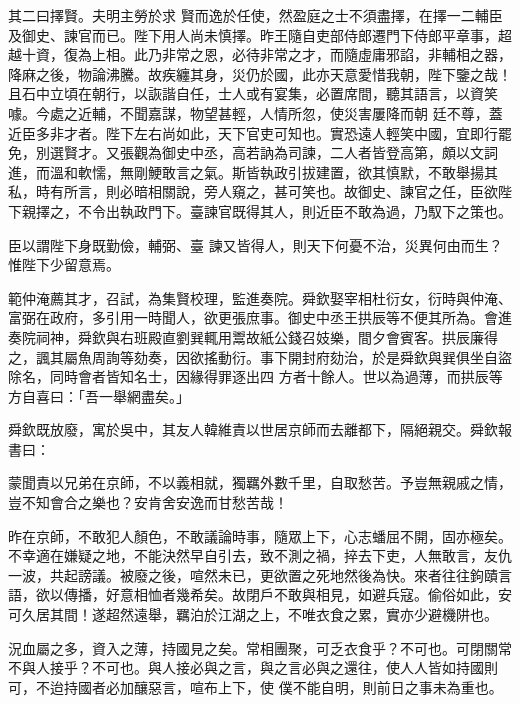 \begin{pinyinscope}
 其二曰擇賢。夫明主勞於求
 賢而逸於任使，然盈庭之士不須盡擇，在擇一二輔臣及御史、諫官而已。陛下用人尚未慎擇。昨王隨自吏部侍郎遷門下侍郎平章事，超越十資，復為上相。此乃非常之恩，必待非常之才，而隨虛庸邪諂，非輔相之器，降麻之後，物論沸騰。故疾纏其身，災仍於國，此亦天意愛惜我朝，陛下鑒之哉！且石中立頃在朝行，以詼諧自任，士人或有宴集，必置席間，聽其語言，以資笑噱。今處之近輔，不聞嘉謀，物望甚輕，人情所忽，使災害屢降而朝
 廷不尊，蓋近臣多非才者。陛下左右尚如此，天下官吏可知也。實恐遠人輕笑中國，宜即行罷免，別選賢才。又張觀為御史中丞，高若訥為司諫，二人者皆登高第，頗以文詞進，而溫和軟懦，無剛鯁敢言之氣。斯皆執政引拔建置，欲其慎默，不敢舉揚其私，時有所言，則必暗相關說，旁人窺之，甚可笑也。故御史、諫官之任，臣欲陛下親擇之，不令出執政門下。臺諫官既得其人，則近臣不敢為過，乃馭下之策也。



 臣以謂陛下身既勤儉，輔弼、臺
 諫又皆得人，則天下何憂不治，災異何由而生？惟陛下少留意焉。



 範仲淹薦其才，召試，為集賢校理，監進奏院。舜欽娶宰相杜衍女，衍時與仲淹、富弼在政府，多引用一時聞人，欲更張庶事。御史中丞王拱辰等不便其所為。會進奏院祠神，舜欽與右班殿直劉巽輒用鬻故紙公錢召妓樂，間夕會賓客。拱辰廉得之，諷其屬魚周詢等劾奏，因欲搖動衍。事下開封府劾治，於是舜欽與巽俱坐自盜除名，同時會者皆知名士，因緣得罪逐出四
 方者十餘人。世以為過薄，而拱辰等方自喜曰：「吾一舉網盡矣。」



 舜欽既放廢，寓於吳中，其友人韓維責以世居京師而去離都下，隔絕親交。舜欽報書曰：



 蒙聞責以兄弟在京師，不以義相就，獨羈外數千里，自取愁苦。予豈無親戚之情，豈不知會合之樂也？安肯舍安逸而甘愁苦哉！



 昨在京師，不敢犯人顏色，不敢議論時事，隨眾上下，心志蟠屈不開，固亦極矣。不幸適在嫌疑之地，不能決然早自引去，致不測之禍，捽去下吏，人無敢言，友仇
 一波，共起謗議。被廢之後，喧然未已，更欲置之死地然後為快。來者往往鉤賾言語，欲以傳播，好意相恤者幾希矣。故閉戶不敢與相見，如避兵寇。偷俗如此，安可久居其間！遂超然遠舉，羈泊於江湖之上，不唯衣食之累，實亦少避機阱也。



 況血屬之多，資入之薄，持國見之矣。常相團聚，可乏衣食乎？不可也。可閉關常不與人接乎？不可也。與人接必與之言，與之言必與之還往，使人人皆如持國則可，不迨持國者必加釀惡言，喧布上下，使
 僕不能自明，則前日之事未為重也。




\end{pinyinscope}
